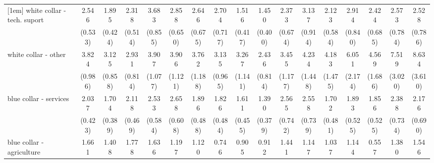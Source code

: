 {\begin{tabular}{l*{16}{c}}
[1em]
white collar - tech. suport&       2.546\sym{***}&       1.895\sym{**} &       2.318\sym{***}&       3.683\sym{***}&       2.858\sym{***}&       2.646\sym{***}&       2.704\sym{***}&       1.516         &       1.450         &       2.373\sym{**} &       3.137\sym{***}&       2.123\sym{**} &       2.914\sym{***}&       2.424\sym{**} &       2.573\sym{**} &       2.528\sym{**} \\
                    &     (0.533)         &     (0.424)         &     (0.514)         &     (0.855)         &     (0.650)         &     (0.675)         &     (0.717)         &     (0.417)         &     (0.400)         &     (0.674)         &     (0.914)         &     (0.584)         &     (0.840)         &     (0.685)         &     (0.784)         &     (0.786)         \\
[1em]
white collar - other&       3.824\sym{***}&       3.125\sym{***}&       2.931\sym{***}&       3.907\sym{***}&       3.906\sym{***}&       3.762\sym{***}&       3.135\sym{***}&       3.267\sym{***}&       2.436\sym{**} &       3.455\sym{***}&       4.234\sym{***}&       4.183\sym{***}&       6.051\sym{***}&       4.569\sym{***}&       7.519\sym{***}&       8.634\sym{***}\\
                    &     (0.986)         &     (0.858)         &     (0.814)         &     (1.077)         &     (1.121)         &     (1.188)         &     (0.965)         &     (1.141)         &     (0.814)         &     (1.177)         &     (1.448)         &     (1.475)         &     (2.174)         &     (1.686)         &     (3.020)         &     (3.610)         \\
[1em]
blue collar - services&       2.037\sym{***}&       1.704\sym{*}  &       2.118\sym{***}&       2.533\sym{***}&       2.658\sym{***}&       1.896\sym{*}  &       1.826\sym{*}  &       1.611         &       1.390         &       2.565\sym{**} &       2.558\sym{**} &       1.702         &       1.893\sym{*}  &       1.856\sym{*}  &       2.388\sym{**} &       2.176\sym{*}  \\
                    &     (0.423)         &     (0.389)         &     (0.469)         &     (0.584)         &     (0.608)         &     (0.488)         &     (0.484)         &     (0.455)         &     (0.379)         &     (0.742)         &     (0.739)         &     (0.481)         &     (0.525)         &     (0.525)         &     (0.734)         &     (0.690)         \\
[1em]
blue collar - agriculture&       1.661         &       1.408         &       1.778         &       1.636         &       1.197         &       1.120         &       0.746         &       0.905         &       0.912         &       1.441         &       1.147         &       1.037         &       1.144         &       0.557         &       1.380         &       1.546         \\

\end{tabular}}

